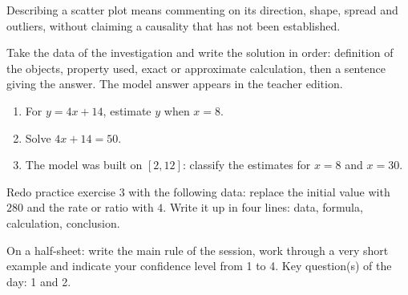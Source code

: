 \begin{traceecrite}Describing a scatter plot means commenting on its direction, shape, spread and outliers, without claiming a causality that has not been established.\end{traceecrite}

\begin{exemple}
Take the data of the investigation and write the solution in order: definition of the objects, property used, exact or approximate calculation, then a sentence giving the answer. The model answer appears in the teacher edition.
\end{exemple}

\begin{exercice}[-- essential]
\begin{enumerate}\item For $y=4x+14$, estimate $y$ when $x=8$.\item Solve $4x+14=50$.\item The model was built on $[2,12]$: classify the estimates for $x=8$ and $x=30$.\end{enumerate}
\end{exercice}


\begin{dm}Redo practice exercise 3 with the following data: replace the initial value with $280$ and the rate or ratio with $4$. Write it up in four lines: data, formula, calculation, conclusion.\end{dm}

\begin{sortie}On a half-sheet: write the main rule of the session, work through a very short example and indicate your confidence level from 1 to 4. Key question(s) of the day: 1 and 2.\end{sortie}

